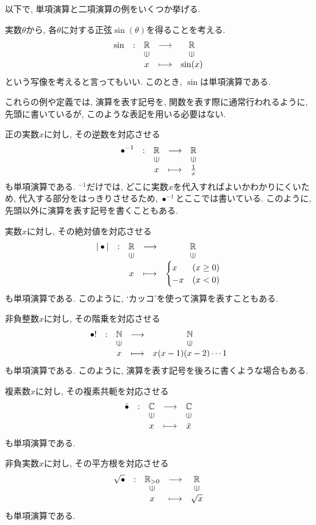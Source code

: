 以下で, 単項演算と二項演算の例をいくつか挙げる.
\begin{example}
  実数$\theta$から,
  各$\theta$に対する正弦$\sin(\theta)$を得ることを考える.
  \begin{align*}
    \shazo{\sin}
          {\RR}{\RR}
          {x}{\sin(x)}
  \end{align*}
  という写像を考えると言ってもいい.
  このとき, $\sin$は単項演算である.  
\end{example}
これらの例や定義では, 演算を表す記号を,
関数を表す際に通常行われるように,
先頭に書いているが,
このような表記を用いる必要はない.
\begin{example}
  正の実数$x$に対し, その逆数を対応させる
  \begin{align*}
    \shazo{\bullet^{-1}}
          {\RR}{\RR}
          {x}{\frac{1}{x}}
  \end{align*}
  も単項演算である.
  ${}^{-1}$だけでは, どこに実数$x$を代入すればよいかわかりにくいため,
  代入する部分をはっきりさせるため,
  $\bullet^{-1}$とここでは書いている.
  このように, 先頭以外に演算を表す記号を書くこともある.
\end{example}
\begin{example}
  実数$x$に対し, その絶対値を対応させる
  \begin{align*}
    \shazo{|\bullet|}
          {\RR}{\RR}
          {x}{\begin{cases}x&(x\geq 0)\\-x&(x<0)\end{cases}}
  \end{align*}
  も単項演算である.
  このように, `カッコ'を使って演算を表すこともある.
\end{example}
\begin{example}
  非負整数$x$に対し, その階乗を対応させる
  \begin{align*}
    \shazo{\bullet !}
          {\NN}{\NN}
          {x}{x(x-1)(x-2)\cdots 1}
  \end{align*}
  も単項演算である.
  このように, 演算を表す記号を後ろに書くような場合もある.
\end{example}
\begin{example}
  複素数$x$に対し, その複素共軛を対応させる
  \begin{align*}
    \shazo{\bar\bullet }
          {\CC}{\CC}
          {x}{\bar{x}}
  \end{align*}
  も単項演算である.
\end{example}
\begin{example}
  非負実数$x$に対し, その平方根を対応させる
  \begin{align*}
    \shazo{\sqrt\bullet }
          {\RR_{>0}}{\RR}
          {x}{\sqrt{x}}
  \end{align*}
  も単項演算である.
\end{example}
